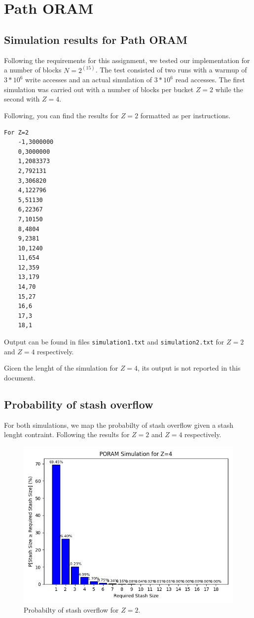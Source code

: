 \section{Path ORAM}

\subsection{Simulation results for Path ORAM}

Following the requirements for this assignment, we tested our implementation for a number of blocks $N=2^(15)$. The test consisted of two runs with a warmup of $3*10^6$ write accesses and an actual simulation of $3*10^6$ read accesses. The first simulation was carried out with a number of blocks per bucket $Z=2$ while the second with $Z=4$.

Following, you can find the results for $Z=2$ formatted as per instructions.

\begin{verbatim}
For Z=2
    -1,3000000
    0,3000000
    1,2083373
    2,792131
    3,306820
    4,122796
    5,51130
    6,22367
    7,10150
    8,4804
    9,2381
    10,1240
    11,654
    12,359
    13,179
    14,70
    15,27
    16,6
    17,3
    18,1
\end{verbatim}

Output can be found in files \texttt{simulation1.txt} and \texttt{simulation2.txt} for $Z=2$ and $Z=4$ respectively.

Gicen the lenght of the simulation for $Z=4$, its output is not reported in this document.

\subsection{Probability of stash overflow}

For both simulations, we map the probabilty of stash overflow given a stash lenght contraint. Following the results for $Z=2$ and $Z=4$ respectively.

\begin{figure}[H]
    \centering
    \includegraphics[width=\textwidth]{02-ex1/plot_z_2.png}
    \caption{Probabilty of stash overflow for $Z=2$.}
    \label{fig:stash-overflow-for-Z=2}
\end{figure}

